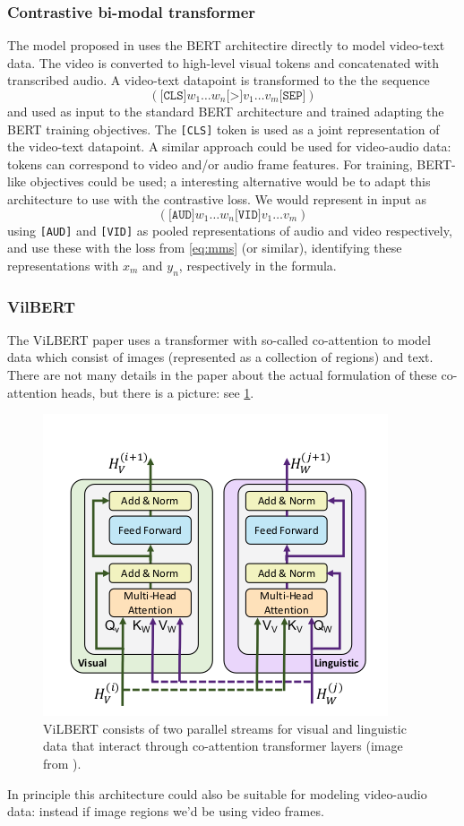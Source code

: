 \subsubsection{Contrastive bi-modal transformer}
\label{sec:cbmt}
The model proposed in \citet{sun2019videobert} uses the BERT
architectire directly to model video-text data. The video is converted
to high-level visual tokens and concatenated with transcribed audio. A
video-text datapoint is transformed to the the sequence
$$(\texttt{[CLS]} w_1\ldots w_n \texttt{[>]} v_1 \dots v_m
\texttt{[SEP]})$$ and used as input to the standard BERT architecture
and trained adapting the BERT training objectives. The \texttt{[CLS]}
token is used as a joint representation of the video-text datapoint. A
similar approach could be used for video-audio data: tokens can
correspond to video and/or audio frame features. For training,
BERT-like objectives could be used; a interesting alternative would be
to adapt this architecture to use with the contrastive loss. We would
represent in input as
$$(\texttt{[AUD]} w_1\ldots w_n \texttt{[VID]} v_1 \dots v_m)$$ using
\texttt{[AUD]} and \texttt{[VID]} as pooled representations of audio
and video respectively, and use these with the loss from \cref{eq:mms}
(or similar), identifying these representations with $x_m$ and $y_n$, respectively
in the formula.


\subsubsection{VilBERT}
The ViLBERT paper \citep{lu2019vilbert} uses a transformer with
so-called co-attention to model data which consist of images
(represented as a collection of regions) and text. There are not many
details in the paper about the actual formulation of these
co-attention heads, but there is a picture: see \cref{fig:coatt}.
\begin{figure}
  \centering
  \includegraphics[scale=0.3]{coatt.png}
  \caption{ViLBERT consists of two parallel streams for visual and
    linguistic data that interact through co-attention transformer
    layers (image from \citep{lu2019vilbert}).}
  \label{fig:coatt}
\end{figure}
In principle this architecture could also be suitable for modeling
video-audio data: instead if image regions we'd be using video frames.

